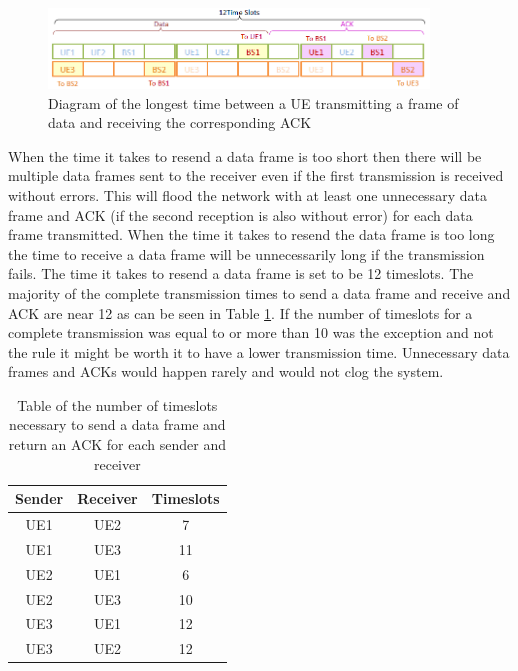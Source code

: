 \begin{figure}[ht]
    \centering
    \includegraphics[width=0.9\textwidth]{ACK_timeout_long.PNG}
    \caption{Diagram of the longest time between a UE transmitting a frame of data and receiving the corresponding ACK}
    \label{fig:ACKtimelong}
\end{figure}

When the time it takes to resend a data frame is too short then there will be multiple data frames sent to the receiver even if the first transmission is received without errors. This will flood the network with at least one unnecessary data frame and ACK (if the second reception is also without error) for each data frame transmitted. When the time it takes to resend the data frame is too long the time to receive a data frame will be unnecessarily long if the transmission fails. The time it takes to resend a data frame is set to be 12 timeslots. The majority of the complete transmission times to send a data frame and receive and ACK are near 12 as can be seen in Table \ref{tab:ACKtime}. If the number of timeslots for a complete transmission was equal to or more than 10 was the exception and not the rule it might be worth it to have a lower transmission time. Unnecessary data frames and ACKs would happen rarely and would not clog the system. 

\begin{table}[ht]
	\centering
		\begin{tabular}{| c | c | c | }
		\hline                       
		Sender & Receiver & Timeslots\\
		\hline
			UE1 & UE2 & 7\\
			UE1 & UE3 & 11\\
			UE2 & UE1 & 6\\
			UE2 & UE3 & 10\\
			UE3 & UE1 & 12\\
			UE3 & UE2 & 12\\
			
		\hline
		\end{tabular}
	\caption{Table of the number of timeslots necessary to send a data frame and return an ACK for each sender and receiver}
	\label{tab:ACKtime}
\end{table}



